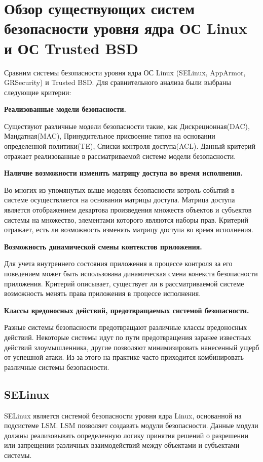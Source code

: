 \section{Обзор существующих систем безопасности 
    уровня ядра ОС Linux и ОС Trusted BSD}

\bigskip
Сравним системы безопасности уровня ядра ОС Linux
(SELinux, AppArmor, GRSecurity) и Trusted BSD. 
Для сравнительного анализа были выбраны следующие 
критерии:

\bigskip
{\bfseries Реализованные модели безопасности.} 

    Существуют различные модели безопасности такие, 
    как Дискреционная(DAC), Мандатная(MAC), Принудительное 
    присвоение типов на основании определенной 
    политики(TE), Списки контроля доступа(ACL). 
    Данный критерий отражает реализованные 
    в рассматриваемой системе модели безопасности.  

\bigskip
{\bfseries Наличие возможности изменять матрицу доступа 
	во время исполнения.}
	
	Во многих из упомянутых выше моделях безопасности 
	котроль событий в системе осуществляется на основании 
	матрицы доступа. Матрица доступа является отображением 
	декартова произведения множеств объектов и субъектов 
	системы на множество, элементами которого являются 
	наборы прав.
	Критерий отражает, есть ли возможность изменять
	матрицу доступа во время исполнения. 

\bigskip 
{\bfseries Возможность динамической смены контекстов
	приложения.}
	
	Для учета внутреннего состояния приложения в 
	процессе контроля за его поведением может быть
	использована динамическая смена конекста безопасности 
	 приложения. 
	Критерий описывает, существует ли в рассматриваемой 
	системе возможность менять права приложения в процессе
	исполнения. 

\bigskip
{\bfseries Классы вредоносных действий, предотвращаемых 
	системой безопасности.}
	
	Разные системы безопасности предотвращают различные 
	классы вредоносных действий. Некоторые системы 
	идут по пути предотвращения заранее известных 
	действий злоумышленника, другие позволяют минимизировать 
	нанесенный ущерб от успешной атаки. Из-за этого на практике 
	часто приходится комбинировать различные системы безопасности.    

\bigskip
\subsection{SELinux} 
SELinux является системой безопасности 
уровня ядра Linux, основанной на 
подсистеме LSM. LSM позволяет 
создавать модули безопасности. Данные модули 
должны реализовывать 
определенную логику принятия решений о 
разрешении или запрещении различных 
взаимодействий между объектами и субъектами 
системы. 

